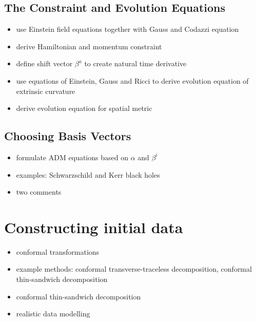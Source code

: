 \documentclass[twocolumn]{article}
\begin{document}
    \subsection{The Constraint and Evolution Equations} %
    \label{sub:the_constraint_and_evolution_equations}
      \begin{itemize}
        \item use Einstein field equations together with Gauss and Codazzi equation
        \item derive Hamiltonian and momentum constraint
        \item define shift vector $β^a$ to create natural time derivative
        \item use equations of Einstein, Gauss and Ricci to derive evolution equation of extrinsic curvature
        \item derive evolution equation for spatial metric
      \end{itemize}

    \subsection{Choosing Basis Vectors} %
    \label{sub:choosing_basis_vectors}
      \begin{itemize}
        \item formulate ADM equations based on $α$ and $β^i$
        \item examples: Schwarzschild and Kerr black holes
        \item two comments
      \end{itemize}

  \section{Constructing initial data} %
  \label{sec:constructing_initial_data}
    \begin{itemize}
      \item conformal transformations
      \item example methods: conformal transverse-traceless decomposition, conformal thin-sandwich decomposition
      \item conformal thin-sandwich decomposition
      \item realistic data modelling
    \end{itemize}
\end{document}
